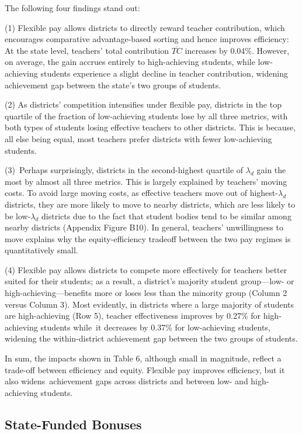 \documentclass[notitlepage,12pt]{article}%
\begin{document}
The following four findings stand out: 

\noindent (1) Flexible pay allows districts to directly
reward teacher contribution, which encourages comparative advantage-based
sorting and hence improves efficiency: At the state level, teachers' total
contribution $\overline{TC}$ increases by 0.04\%. However, on average, the
gain accrues entirely to high-achieving students, while low-achieving students
experience a slight decline in teacher contribution, widening achievement gap
between the state's two groups of students.

(2) As districts'
competition intensifies under flexible pay, districts in the top quartile of the
fraction of low-achieving students lose by all three metrics, with both types
of students losing effective teachers to other districts. This is because, all
else being equal, most teachers prefer districts with fewer low-achieving
students. 

(3)\ Perhaps surprisingly, districts in the second-highest quartile of $\lambda_{d}$
 gain the most by almost all three metrics. This is largely
explained by teachers' moving costs. To avoid large moving costs, as effective
teachers move out of highest-$\lambda_{d}$ districts, they are more likely to
move to nearby districts, which are less likely to be low-$\lambda_{d}$
districts due to the fact that student bodies tend to be similar among nearby
districts (Appendix Figure B10). In general, teachers' unwillingness to move explains why the equity-efficiency tradeoff between the two pay regimes is quantitatively small.

(4) Flexible pay allows
districts to compete more effectively for teachers better suited for their
students; as a result, a district's majority student group---low- or
high-achieving---benefits more or loses less than the minority group (Column 2
versus Column 3). Most evidently, in districts where a large majority of
students are high-achieving (Row 5), teacher effectiveness improves by 0.27\%
for high-achieving students while\ it decreases by 0.37\% for low-achieving
students, widening the within-district achievement gap between the two groups
of students.

In sum, the impacts shown in Table 6, although small in magnitude, reflect a
trade-off between efficiency and equity. Flexible pay improves efficiency, but
it also widens\ achievement gaps across districts and between low- and
high-achieving students.

\subsection{State-Funded Bonuses}
\end{document}
